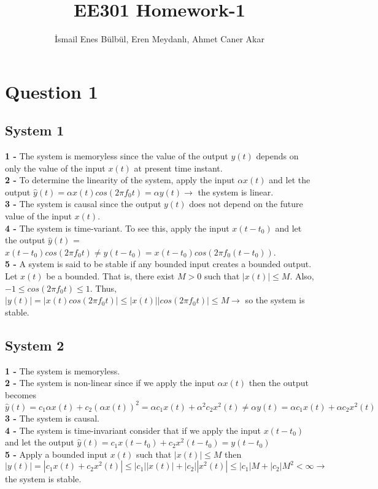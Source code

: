 \documentclass[12pt]{article}
\title{EE301 Homework-1}
\author{İsmail Enes Bülbül, Eren Meydanlı, Ahmet Caner Akar}
\begin{document}
\maketitle


    \section*{Question 1}
    \subsection*{System 1}
    \textbf{1 - }The system is memoryless since the value of the output \(y(t)\) depends on
    only the value of the input \(x(t)\) at present time instant.\\
    \textbf{2 - }To determine the linearity of the system, apply the input \(\alpha x(t)\) and let the
    output \(\hat{y}(t)=\alpha x(t)cos(2\pi f_0t)=\alpha y(t) \longrightarrow\) the system is linear.\\
    \textbf{3 - }The system is causal since the output \(y(t)\) does not depend on the future
    value of the input \(x(t)\).\\
    \textbf{4 - }The system is time-variant. To see this, apply the input \(x(t-t_0)\) and let the
    output \(\hat{y}(t)\) = \(x(t-t_0)cos(2\pi f_0t) \neq  y(t-t_0) = x(t-t_0)  cos(2\pi f_0(t-t_0))\).\\ 
    \textbf{5 - }A system is said to be stable if any bounded input creates a bounded
    output. Let \(x(t)\) be a bounded. That is, there exist \(M > 0\) such that \(\left\lvert x(t)\right\rvert \leq  M\).
    Also, \(-1 \leq cos(2\pi f_0t) \leq 1\). Thus, \(\left\lvert y(t)\right\rvert  = \left\lvert x(t)cos(2\pi f_0t)\right\rvert  \leq \left\lvert x(t)\right\rvert \left\lvert cos(2\pi f_0t)\right\rvert  \leq M \longrightarrow \) so the system is stable. \\
    \subsection*{System 2}
    \textbf{1 - }The system is memoryless.\\
    \textbf{2 - }The system is non-linear since if we apply the input \(\alpha x(t)\) then the output
    becomes 
    \(\hat{y}(t) = c_1\alpha x(t) + c_2(\alpha x(t))^2 = \alpha c_1x(t) + \alpha^2 c_2x^2(t) \neq \alpha y(t) = \alpha c_1x(t) + \alpha c_2x^2(t)\) \\
    \textbf{3 - }The system is causal. \\
    \textbf{4 - }The system is time-invariant consider that if we apply the input \(x(t-t_0)\) and
    let the output \(\hat{y}(t)=c_1x(t-t_0) + c_2x^2(t-t_0) = y(t-t_0)\)\\
    \textbf{5 - }Apply a bounded input \(x(t)\) such that \(\left\lvert x(t)\right\rvert \leq M\) then 
    \(\left\lvert y(t)\right\rvert  = \left\lvert c_1x(t) + c_2x^2(t)\right\rvert \leq \left\lvert c_1\right\rvert \left\lvert x(t)\right\rvert  + \left\lvert c_2\right\rvert \left\lvert x^2(t)\right\rvert  \leq \left\lvert c_1\right\rvert M + \left\lvert c_2\right\rvert M^2 < \infty \longrightarrow\) the system is stable.\\
\end{document}
